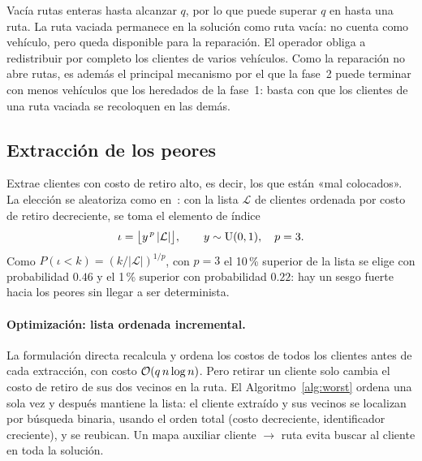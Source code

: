 \begin{algorithm}[H]
\caption{ ()}
\label{alg:route}
\end{algorithm}

Vacía rutas enteras hasta alcanzar $q$, por lo que puede superar $q$ en hasta una ruta. La
ruta vaciada permanece en la solución como ruta vacía: no cuenta como vehículo, pero queda
disponible para la reparación. El operador obliga a redistribuir por completo los clientes de
varios vehículos. Como la reparación no abre rutas, es además el principal mecanismo por el
que la fase~2 puede terminar con menos vehículos que los heredados de la fase~1: basta con
que los clientes de una ruta vaciada se recoloquen en las demás.

\subsection{Extracción de los peores}
\label{sec:worst}

Extrae clientes con costo de retiro alto, es decir, los que están «mal colocados». La
elección se aleatoriza como en~\cite{ropke2006}: con la lista $\mathcal{L}$ de clientes
ordenada por costo de retiro decreciente, se toma el elemento de índice
\begin{equation}
\iota=\bigl\lfloor y^{\,p}\,|\mathcal{L}|\bigr\rfloor,\qquad y\sim\mathrm{U}(0,1),\quad p=3 .
\label{eq:sesgo}
\end{equation}
Como $P(\iota<k)=(k/|\mathcal{L}|)^{1/p}$, con $p=3$ el 10\,\% superior de la lista se elige
con probabilidad $0.46$ y el 1\,\% superior con probabilidad $0.22$: hay un sesgo fuerte
hacia los peores sin llegar a ser determinista.

\paragraph{Optimización: lista ordenada incremental.} La formulación directa recalcula y
ordena los costos de todos los clientes antes de cada extracción, con costo
$\mathcal{O}(q\,n\log n)$. Pero retirar un cliente solo cambia el costo de retiro de sus dos vecinos
en la ruta. El Algoritmo~\ref{alg:worst} ordena una sola vez y después mantiene la lista:
el cliente extraído y sus vecinos se localizan por búsqueda binaria, usando el orden total
(costo decreciente, identificador creciente), y se reubican. Un mapa auxiliar cliente
$\to$ ruta evita buscar al cliente en toda la solución.

